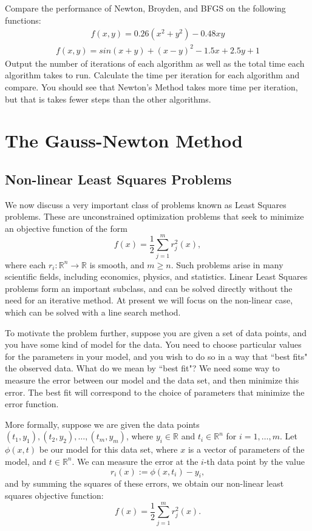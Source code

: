 \begin{problem}
Compare the performance of Newton, Broyden, and BFGS on the following functions:
\begin{align*}
f(x,y) = 0.26(x^2+y^2) - 0.48xy
\end{align*}
\begin{align*}
f(x,y) = sin(x+y) + (x-y)^2 - 1.5x + 2.5y + 1
\end{align*}
Output the number of iterations of each algorithm as well as the total time
each algorithm takes to run. Calculate the time per iteration for each algorithm
and compare. You should see that Newton's Method takes more time per iteration, but
that is takes fewer steps than the other algorithms.
\end{problem}

\section*{The Gauss-Newton Method}
\subsection*{Non-linear Least Squares Problems}
We now discuss a very important class of problems known as Least Squares problems. These
are unconstrained optimization problems that seek to minimize an objective function of the form
$$
f(x) = \frac{1}{2}\displaystyle\sum_{j=1}^m r_j^2(x),
$$
where each $r_i : \mathbb{R}^n \rightarrow \mathbb{R}$ is smooth, and $m \geq n$. Such problems
arise in many scientific fields, including economics, physics, and statistics. Linear Least
Squares problems form an important subclass, and can be solved directly without the need for an
iterative method. At present we will focus on the non-linear case, which can be solved with a
line search method.

To motivate the problem further, suppose you are given a set of data points, and you have some kind of model for the data.
You need to choose particular values for the parameters in your model, and you wish to do so in a way that ``best fits"
the observed data. What do we mean by ``best fit"? We need some way to measure the error between our model and the data set,
and then minimize this error. The best fit will correspond to the choice of parameters that minimize the error function.

More formally, suppose we are given the data points $(t_1, y_1), (t_2, y_2), \ldots, (t_m, y_m)$, where $y_i \in \mathbb{R}$
and $t_i \in \mathbb{R}^n$ for $i = 1, \ldots, m$. Let $\phi(x, t)$ be our model for this data set, where $x$ is
a vector of parameters of the model, and $t \in \mathbb{R}^n$. We can measure the error at the $i$-th data point by the value
$$r_i(x) := \phi(x, t_i) - y_i,$$ and by summing the squares of these errors, we obtain our non-linear least squares objective
function:
$$
f(x) = \frac{1}{2} \displaystyle \sum_{j=1}^m  r_j^2(x).
$$

